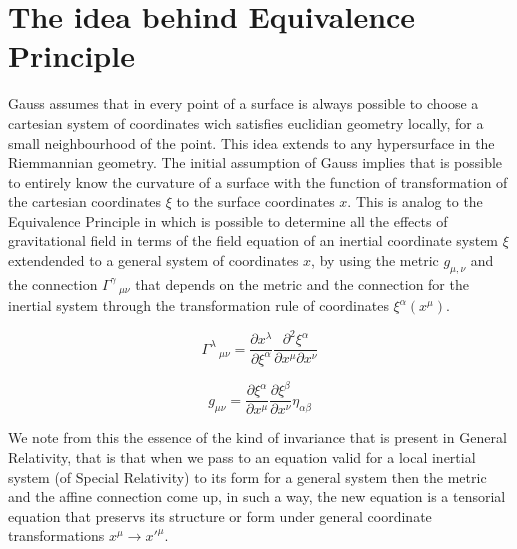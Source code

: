 \documentclass[10pt, letterpaper, oneside]{book}
\theoremstyle{theorem} %
\theoremstyle{theorem} %
\theoremstyle{definition}
\theoremstyle{remark}
\theoremstyle{definition}
\theoremstyle{definition}
\theoremstyle{theorem}
\begin{document}
\section{The idea behind Equivalence Principle}
Gauss assumes that in every point of a surface is always possible to choose a cartesian system of coordinates wich satisfies euclidian geometry locally, for a small neighbourhood of the point. This idea extends to any hypersurface in the Riemmannian geometry. The initial assumption of Gauss implies that is possible to entirely know the curvature of a surface with the function of transformation of the cartesian coordinates $\xi$ to the surface coordinates $x$. This is analog to the Equivalence Principle in which is possible to determine all the effects of gravitational field in terms of the field equation of an inertial coordinate system $\xi$ extendended to a general system of coordinates $x$, by using the metric  $g_{\mu,\nu}$ and the connection $\Gamma^{\gamma}\,_{\mu \nu}$ that depends on the metric and the connection for the inertial system through the transformation rule of coordinates $\xi^\alpha(x^\mu)$.

$$\Gamma^\lambda\,_{\mu\nu} = \frac{\partial x^\lambda}{\partial \xi^\alpha}\frac{\partial^2\xi^\alpha}{\partial x^\mu \partial x^\nu}$$

$$g_{\mu\nu}=\frac{\partial \xi^\alpha}{\partial x^\mu} \frac{\partial \xi^\beta}{\partial x^\nu} \eta_{\alpha\beta}$$

We note from this the essence of the kind of invariance that is present in General Relativity, that is that when we pass to an equation valid for a local inertial system (of Special Relativity) to its form for a general system then the metric and the affine connection come up, in such a way, the new equation is a tensorial equation that preservs its structure or form under general coordinate transformations $x^\mu \to x'^\mu$.
\end{document}
